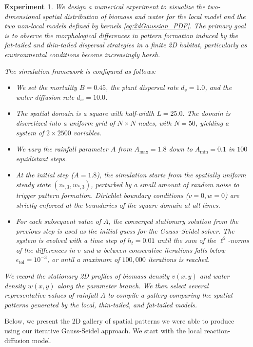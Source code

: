 \documentclass[11pt, a4paper]{article}
\theoremstyle{break}
\theoremstyle{break}
\theoremstyle{break}
\theoremstyle{break}
\theoremstyle{break}
\theoremstyle{break}
\theoremstyle{break}
\theoremstyle{break}
\theoremstyle{break}
\newtheorem{expe}{Experiment}[section]
\theoremstyle{break}
\begin{document}
\begin{expe}
    We design a numerical experiment to visualize the two-dimensional spatial distribution of biomass and water for the local model and the two non-local models defined by kernels \eqref{eq:2dGaussian_PDF}. The primary goal is to observe the morphological differences in pattern formation induced by the fat-tailed and thin-tailed dispersal strategies in a finite 2D habitat, particularly as environmental conditions become increasingly harsh.
    
    The simulation framework is configured as follows:
    \begin{itemize}
        \item We set the mortality $B = 0.45$, the plant dispersal rate $d_v = 1.0$, and the water diffusion rate $d_w = 10.0$.
        \item The spatial domain is a square with half-width $L = 25.0$. The domain is discretized into a uniform grid of $N \times N$ nodes, with $N = 50$, yielding a system of $2 \times 2500$ variables.
        \item We vary the rainfall parameter $A$ from $A_{\text{max}} = 1.8$ down to $A_{\text{min}} = 0.1$ in $100$ equidistant steps.
        \item At the initial step ($A = 1.8$), the simulation starts from the spatially uniform steady state $(v_{*,3}, w_{*,3})$, perturbed by a small amount of random noise to trigger pattern formation. Dirichlet boundary conditions ($v=0, w=0$) are strictly enforced at the boundaries of the square domain at all times.
        \item For each subsequent value of $A$, the converged stationary solution from the previous step is used as the initial guess for the Gauss--Seidel solver. The system is evolved with a time step of $h_t = 0.01$ until the sum of the $\ell^2$-norms of the differences in $v$ and $w$ between consecutive iterations falls below $\epsilon_{\text{tol}} = 10^{-3}$, or until a maximum of $100,000$ iterations is reached.
    \end{itemize}
    We record the stationary 2D profiles of biomass density $v(x,y)$ and water density $w(x,y)$ along the parameter branch. We then select several representative values of rainfall $A$ to compile a gallery comparing the spatial patterns generated by the local, thin-tailed, and fat-tailed models.
\end{expe}

Below, we present the 2D gallery of spatial patterns we were able to produce using our iterative Gauss-Seidel approach. We start with the local reaction-diffusion model.
\end{document}
